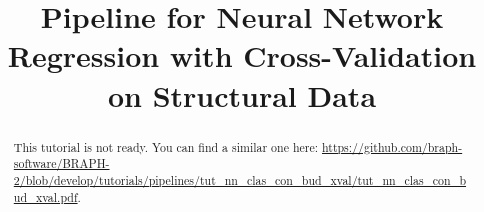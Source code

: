 \documentclass[justified]{tufte-handout}
\title[Regression Cross-Validation Structural Data]{Pipeline for Neural Network Regression with Cross-Validation on Structural Data}
\begin{document}
\maketitle

\begin{abstract}
\noindent
This tutorial is not ready. You can find a similar one here: \url{https://github.com/braph-software/BRAPH-2/blob/develop/tutorials/pipelines/tut_nn_clas_con_bud_xval/tut_nn_clas_con_bud_xval.pdf}.
\end{abstract}
\end{document}
